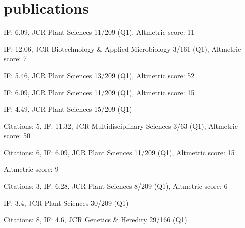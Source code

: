 \documentclass[]{friggeri-cv} %
\begin{document}

\section{publications}

\cite{bayer2017assembly}
\hspace{0.4cm} IF: 6.09, JCR Plant Sciences 11/209 (Q1), Altmetric score: 11

\cite{yuan2017improvements}
\hspace{0.4cm} IF: 12.06, JCR Biotechnology \& Applied Microbiology 3/161 (Q1), Altmetric score: 7

\cite{montenegro2017pangenome}
\hspace{0.4cm} IF: 5.46, JCR Plant Sciences 13/209 (Q1), Altmetric score: 52

\cite{kaur2017advanced}
\hspace{0.4cm} IF: 6.09, JCR Plant Sciences 11/209 (Q1), Altmetric score: 15

\cite{gacek2016genome}
\hspace{0.4cm} IF: 4.49, JCR Plant Sciences 15/209 (Q1)

\cite{golicz2016pangenome}
\hspace{0.4cm} Citations: 5, IF: 11.32, JCR Multidisciplinary Sciences 3/63 (Q1), Altmetric score: 50

\cite{hane2017comprehensive}
\hspace{0.4cm} Citations: 6, IF: 6.09, JCR Plant Sciences 11/209 (Q1), Altmetric score: 15

\cite{barash2016candidate}
\hspace{0.4cm} Altmetric score: 9

\cite{lee2016genome}
\hspace{0.4cm} Citations; 3, IF: 6.28, JCR Plant Sciences 8/209 (Q1), Altmetric score: 6

\cite{bayer2016genomics}

\cite{visendi2016efficient}
\hspace{0.4cm} IF: 3.4, JCR Plant Sciences 30/209 (Q1)

\cite{mason2016centromere}
\hspace{0.4cm} Citations: 8, IF: 4.6, JCR Genetics \& Heredity 29/166 (Q1)

\cite{bayer2016skim}
\end{document}
